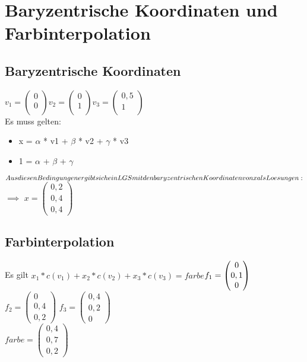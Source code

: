 \documentclass[10pt,a4paper]{article}
\begin{document}
\section{Baryzentrische Koordinaten und Farbinterpolation}

\subsection{Baryzentrische Koordinaten}

$
v_1 =\begin{pmatrix}
0 \\
0 \\

\end{pmatrix}
$$
v_2 =\begin{pmatrix}
0 \\
1 \\

\end{pmatrix}
$$
v_3 =\begin{pmatrix}
	0,5 \\
	1\\
	 
\end{pmatrix}
$\\
Es muss gelten:

\begin{itemize}
 \item  x = $\alpha$ * v1 + $\beta$ * v2 + $\gamma$ * v3
 \item  1 = $\alpha$ + $\beta$ + $\gamma$
\end{itemize}
$\\
Aus diesen Bedingungen ergibt sich ein LGS mit den baryzentrischen Koordinaten von x als Loesungen:
$\\
$\implies$
$
x =\begin{pmatrix}
0,2 \\
0,4 \\
0,4 
\end{pmatrix}
$



\subsection{Farbinterpolation}

Es gilt $x_1*c(v_1)+x_2*c(v_2)+x_3*c(v_3) = farbe$$
\\f_1 =\begin{pmatrix}
0 \\
0,1 \\
0
\end{pmatrix}
$ $
f_2 =\begin{pmatrix}
0 \\
0,4 \\
 0,2
\end{pmatrix}
$ 
$
f_3 =\begin{pmatrix}
0,4  \\
0,2\\
0
\end{pmatrix}
$
\\
$
farbe =\begin{pmatrix}
0,4 \\
0,7\\
 0,2
\end{pmatrix}
$ 
\end{document}
